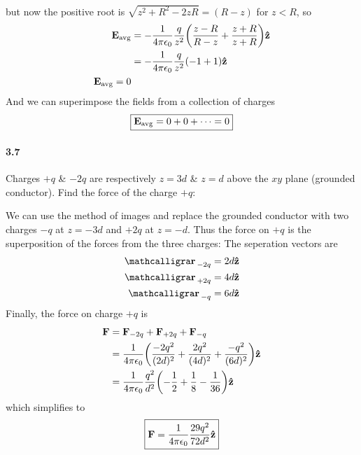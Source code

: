 \documentclass[../main.tex]{subfiles}
\begin{document}
\begin{enumerate}
\begin{align*}
    \end{align*}
    but now the positive root is $\sqrt{z^2 + R^2 - 2zR} = (R - z)$ for $z < R$, so
    \begin{align*}
        \vb E_\text{avg} &= -\ke \frac{q}{z^2} \qt(\frac{z - R}{R - z} + \frac{z + R}{z + R}) \vu z \\
        &= -\ke \frac{q}{z^2} \qt(-1 + 1) \vu z \\
        \vb E_\text{avg} = 0
    \end{align*}
    And we can superimpose the fields from a collection of charges 
    \begin{align*}
        \boxed{
            \vb E_\text{avg} = 0 + 0 + \cdots = 0
        }
    \end{align*}
\end{enumerate}

\newpage
\paragraph{3.7} Charges $+q$ \& $-2q$ are respectively $z = 3d$ \& $z = d$ above the $xy$ plane (grounded conductor). Find the force of the charge $+q$:

We can use the method of images and replace the grounded conductor with two charges $-q$ at $z = -3d$ and $+2q$ at $z = -d$. 
Thus the force on $+q$ is the superposition of the forces from the three charges:
The seperation vectors are 
\begin{align*}
    \vb \scriptr_{-2q} &= 2d \vu z \\
    \vb \scriptr_{+2q} &= 4d \vu z \\
    \vb \scriptr_{-q} &= 6d \vu z
\end{align*}
Finally, the force on charge $+q$ is
\begin{align*}
    \vb F &= \vb F_{-2q} + \vb F_{+2q} + \vb F_{-q} \\
    &= \ke \qt(
        \frac{-2q^2}{(2d)^2} + \frac{2q^2}{(4d)^2} + \frac{-q^2}{(6d)^2}
    ) \vu z \\
    &= \ke \frac{q^2}{d^2} \qt(-\frac{1}{2} + \frac{1}{8} - \frac{1}{36}) \vu z
\end{align*}
which simplifies to
\begin{align*}
    \boxed{
        \vb F = \frac{1}{4\pi\epsilon_0} \frac{29q^2}{72d^2} \vu z
    }
\end{align*}

\newpage
\end{document}
